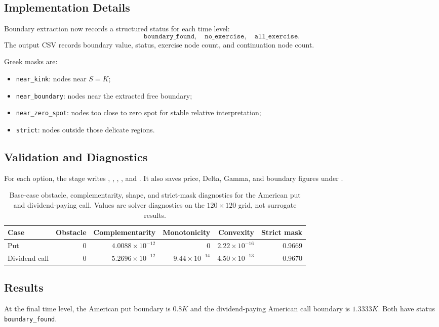 \documentclass[11pt]{article}
\begin{document}
\subsection{Implementation Details}
Boundary extraction now records a structured status for each time level:
\[
\texttt{boundary\_found},\quad \texttt{no\_exercise},\quad \texttt{all\_exercise}.
\]
The output CSV records boundary value, status, exercise node count, and continuation node count.

Greek masks are:
\begin{itemize}
  \item \texttt{near\_kink}: nodes near $S=K$;
  \item \texttt{near\_boundary}: nodes near the extracted free boundary;
  \item \texttt{near\_zero\_spot}: nodes too close to zero spot for stable relative interpretation;
  \item \texttt{strict}: nodes outside those delicate regions.
\end{itemize}

\subsection{Validation and Diagnostics}
For each option, the stage writes ,
, ,
, and . It also saves
price, Delta, Gamma, and boundary figures under
.

\begin{table}[h]
\centering
\begin{tabular}{lrrrrr}
\toprule
Case & Obstacle & Complementarity & Monotonicity & Convexity & Strict mask\\
\midrule
Put & 0 & $4.0088\times10^{-12}$ & 0 & $2.22\times10^{-16}$ & 0.9669\\
Dividend call & 0 & $5.2696\times10^{-12}$ & $9.44\times10^{-14}$ & $4.50\times10^{-13}$ & 0.9670\\
\bottomrule
\end{tabular}
\caption{Base-case obstacle, complementarity, shape, and strict-mask diagnostics for the American put and dividend-paying call. Values are solver diagnostics on the \(120\times120\) grid, not surrogate results.}
\end{table}

\subsection{Results}
At the final time level, the American put boundary is $0.8K$ and the
dividend-paying American call boundary is $1.3333K$. Both have status
\texttt{boundary\_found}.
\end{document}
